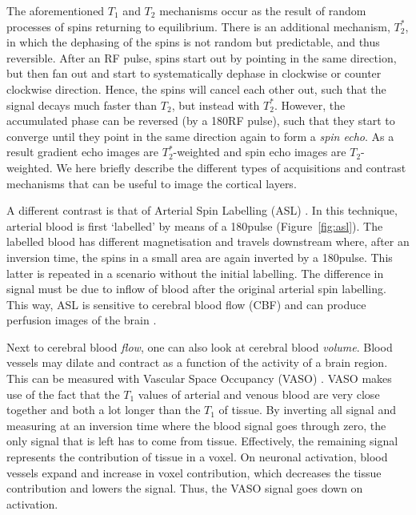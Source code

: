 The aforementioned $T_1$ and $T_2$ mechanisms occur as the result of random processes of spins returning to equilibrium. There is an additional mechanism, $T_2^*$, in which the dephasing of the spins is not random but predictable, and thus reversible. After an RF pulse, spins start out by pointing in the same direction, but then fan out and start to systematically dephase in clockwise or counter clockwise direction. Hence, the spins will cancel each other out, such that the signal decays much faster than $T_2$, but instead with $T_2^*$. However, the accumulated phase can be reversed (by a 180\textdegree RF pulse), such that they start to converge until they point in the same direction again to form a \emph{spin echo}. As a result gradient echo images are $T_2^*$-weighted and spin echo images are $T_2$-weighted. We here briefly describe the different types of acquisitions and contrast mechanisms that can be useful to image the cortical layers.

A different contrast is that of Arterial Spin Labelling (ASL) \cite{Williams1992,Detre1994}. In this technique, arterial blood is first `labelled' by means of a 180\textdegree pulse (Figure~\ref{fig:asl}). The labelled blood has different magnetisation and travels downstream where, after an inversion time, the spins in a small area are again inverted by a 180\textdegree pulse. This latter is repeated in a scenario without the initial labelling. The difference in signal must be due to inflow of blood after the original arterial spin labelling. This way, ASL is sensitive to cerebral blood flow (CBF) and can produce perfusion images of the brain \cite{Petcharunpaisan2010}.

Next to cerebral blood \emph{flow}, one can also look at cerebral blood \emph{volume}. Blood vessels may dilate and contract as a function of the activity of a brain region. This can be measured with Vascular Space Occupancy (VASO) \cite{Lu2003}. VASO makes use of the fact that the $T_1$ values of arterial and venous blood are very close together and both a lot longer than the $T_1$ of tissue. By inverting all signal and measuring at an inversion time where the blood signal goes through zero, the only signal that is left has to come from tissue. Effectively, the remaining signal represents the contribution of tissue in a voxel. On neuronal activation, blood vessels expand and increase in voxel contribution, which decreases the tissue contribution and lowers the signal. Thus, the VASO signal goes down on activation.

